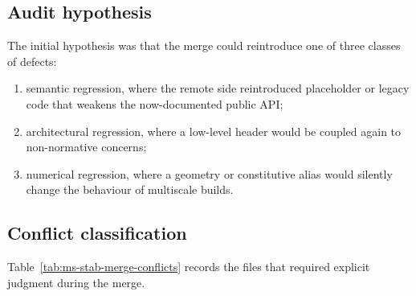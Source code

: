 \subsection{Audit hypothesis}

The initial hypothesis was that the merge could reintroduce one of three
classes of defects:
\begin{enumerate}
  \item semantic regression, where the remote side reintroduced placeholder or
    legacy code that weakens the now-documented public API;
  \item architectural regression, where a low-level header would be coupled
    again to non-normative concerns;
  \item numerical regression, where a geometry or constitutive alias would
    silently change the behaviour of multiscale builds.
\end{enumerate}

\subsection{Conflict classification}

Table~\ref{tab:ms-stab-merge-conflicts} records the files that required
explicit judgment during the merge.

